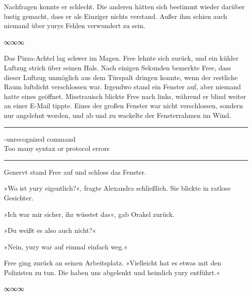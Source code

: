 Nachfragen konnte er schlecht. Die anderen hätten sich bestimmt wieder darüber lustig gemacht, dass er als Einziger nichts verstand. Außer ihm schien auch niemand über yurys Fehlen verwundert zu sein.

\begin{center}
∞∞∞
\end{center}

Das Pizza-Achtel lag schwer im Magen. Free lehnte sich zurück, und ein kühler Luftzug strich über seinen Hals. Nach einigen Sekunden bemerkte Free, dass dieser Luftzug unmöglich aus dem Türspalt dringen konnte, wenn der restliche Raum luftdicht verschlossen war. Irgendwo stand ein Fenster auf, aber niemand hatte eines geöffnet. Misstrauisch blickte Free nach links, während er blind weiter an einer E-Mail tippte. Eines der großen Fenster war nicht verschlossen, sondern nur angelehnt worden, und ab und zu wackelte der Fensterrahmen im Wind.

\noindent \parbox{\textwidth}{ \vspace{3ex} \hrule \vspace{3ex}

    \begin{footnotesize}
    \begin{ttfamily}

-unrecognized command\\
 Too many syntax or protocol errors

    \end{ttfamily}
    \end{footnotesize}

\vspace{3ex} \hrule \vspace{3ex} }

Genervt stand Free auf und schloss das Fenster.

»Wo ist yury eigentlich?«, fragte Alexandra schließlich. Sie blickte in ratlose Gesichter.

»Ich war mir sicher, ihr wüsstet das«, gab Orakel zurück.

»Du weißt es also auch nicht?«

»Nein, yury war auf einmal einfach weg.«

Free ging zurück an seinen Arbeitsplatz. »Vielleicht hat es etwas mit den Polizisten zu tun. Die haben uns abgelenkt und heimlich yury entführt.«

\begin{center}
∞∞∞
\end{center}

